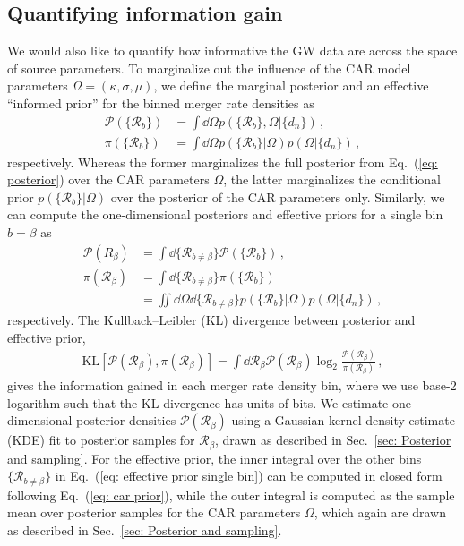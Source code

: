 \documentclass[%
reprint,
 amsmath,amssymb,
 aps,
 prd,nofootinbib,nobibnotes,
 superscriptaddress,groupedaddress,
]{revtex4-2}
\begin{document}
\subsection{Quantifying information gain}
\label{sec: Quantifying information gain} 

We would also like to quantify how informative the GW data are across the space of source parameters. To marginalize out the influence of the CAR model parameters $\Omega=(\kappa,\sigma,\mu)$, we define the marginal posterior and an effective ``informed prior'' for the binned merger rate densities as
\begin{align}
\mathcal{P} ( \{\mathcal{R}_b\} )
& =
\int \dd{\Omega}
p ( \{\mathcal{R}_b\} , \Omega | \{d_n\} )
\, ,
\label{eq: posterior all bins}
\\
\pi ( \{\mathcal{R}_b\} )
& =
\int \dd{\Omega}
p ( \{\mathcal{R}_b\} | \Omega ) p ( \Omega | \{d_n\} )
\label{eq: effective prior all bins}
\, ,
\end{align}
respectively. Whereas the former marginalizes the full posterior from Eq.~(\ref{eq: posterior}) over the CAR parameters $\Omega$, the latter marginalizes the conditional prior $p(\{\mathcal{R}_b\}|\Omega)$ over the posterior of the CAR parameters only. Similarly, we can compute the one-dimensional posteriors and effective priors for a single bin $b=\beta$ as
\begin{align}
\mathcal{P} ( R_\beta )
& =
\int \dd { \{ \mathcal{R}_{b\neq\beta} \} }
\mathcal{P} ( \{ \mathcal{R}_b \} )
\, ,
\label{eq: posterior single bin}
\\
\pi ( \mathcal{R}_\beta )
& =
\int \dd { \{ \mathcal{R}_{b\neq\beta} \} }
\pi ( \{ \mathcal{R}_b \} )
\nonumber \\
& =
\iint \dd{\Omega} \dd { \{ \mathcal{R}_{b\neq\beta} \} }
p ( \{\mathcal{R}_b\} | \Omega ) p ( \Omega | \{d_n\} )
\, ,
\label{eq: effective prior single bin}
\end{align}
respectively. The Kullback--Leibler (KL) divergence between posterior and effective prior,
\begin{align}
\mathrm{KL} [ \mathcal{P}(\mathcal{R}_\beta) , \pi(\mathcal{R}_\beta) ]
=
\int \dd{\mathcal{R}_\beta}
\mathcal{P}(\mathcal{R}_\beta)
\log_2 \frac{ \mathcal{P}(\mathcal{R}_\beta) }{ \pi(\mathcal{R}_\beta) }
\, ,
\label{eq: kl}
\end{align}
gives the information gained in each merger rate density bin, where we use base-2 logarithm such that the KL divergence has units of bits. We estimate one-dimensional posterior densities $\mathcal{P}(\mathcal{R}_\beta)$ using a Gaussian kernel density estimate (KDE) fit to posterior samples for $\mathcal{R}_\beta$, drawn as described in Sec.~\ref{sec: Posterior and sampling}. For the effective prior, the inner integral over the other bins $\{\mathcal{R}_{b\neq\beta}\}$ in Eq.~(\ref{eq: effective prior single bin}) can be computed in closed form following Eq.~(\ref{eq: car prior}), while the outer integral is computed as the sample mean over posterior samples for the CAR parameters $\Omega$, which again are drawn as described in Sec.~\ref{sec: Posterior and sampling}.
\end{document}

